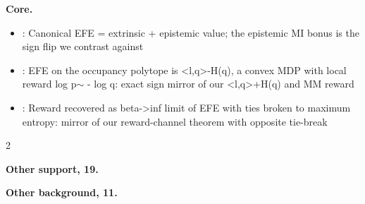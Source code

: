 \documentclass[10pt]{article}
\newcommand{\memb}[1]{\par\smallskip\textbf{#1}\quad}
\begin{document}
\memb{Core.}
\begin{itemize}[nosep,leftmargin=1.2em]
\item \citet{Friston-active15}: Canonical EFE = extrinsic + epistemic value; the epistemic MI bonus is the sign flip we contrast against
\item \citet{Milosevic-active26}: EFE on the occupancy polytope is \textless{}l,q\textgreater{}-H(q), a convex MDP with local reward log p\ensuremath{\sim} - log q: exact sign mirror of our \textless{}l,q\textgreater{}+H(q) and MM reward
\item \citet{DaCosta-reward23}: Reward recovered as beta-\textgreater{}inf limit of EFE with ties broken to maximum entropy: mirror of our reward-channel theorem with opposite tie-break
\end{itemize}
\begin{multicols}{2}
\memb{Other support, 19.} \citetext{\citealp{Schwartenbeck-exploration13}; \citealp{Friston-active16}; \citealp{Friston-active17}; \citealp{Friston-active17a}; \citealp{DaCosta-active20}; \citealp{Friston-sophisticated21}; \citealp{Sajid-active21}; \citealp{Champion-reframing26}; \citealp{Champion-realizing21}; \citealp{Koudahl-epistemics21}; \citealp{Markovic-empirical21}; \citealp{Sajid-active21b}; \citealp{Cooper-expected26}; \citealp{Kouw-expected26}; \citealp{Friston-active12}; \citealp{Schwartenbeck-evidence15}; \citealp{Tschantz-reinforcement20}; \citealp{Shin-prior22}; \citealp{DaCosta-active24}}

\memb{Other background, 11.} {\footnotesize \citetext{\citealp{Parr-uncertainty17}; \citealp{Friston-deep18}; \citealp{Parr-active22}; \citealp{Smith-step22}; \citealp{Nuijten-message25}; \citealp{Nuijten-expected26}; \citealp{Nuijten-sophisticated26}; \citealp{Nuijten-what26}; \citealp{Paul-active21}; \citealp{Torresan-prior25}; \citealp{Wen-missing25}}}

\end{multicols}
\end{document}
